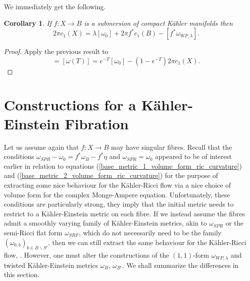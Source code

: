 \documentclass[12pt]{article}
\newtheorem{corollary}[theorem]{Corollary}
\numberwithin{equation}{section}
\begin{document}
\noindent We immediately get the following.

\begin{corollary}
If $f:X \to B$ is a submersion of compact K\"ahler manifolds then
\begin{equation*}
    2\pi c_1(X) = \lambda [\omega_0] + 2\pi f^* c_1(B) - [f^*\omega_{WP,\lambda}].
\end{equation*}
\end{corollary}

\begin{proof}
Apply the previous result to
\begin{equation*}
    [f^*\eta] = [\omega(T)] = e^{-T} [\omega_0] - (1-e^{-T}) 2\pi c_1(X).
\end{equation*}
\end{proof}

\section{Constructions for a K\"ahler-Einstein Fibration}

\noindent Let us assume again that $f: X \to B$ may have singular fibres. Recall that the conditions $\omega_{SPR} - \omega_0 = f^*\omega_B - f^*\eta$ and $\omega_{SPR} = \omega_0$ appeared to be of interest earlier in relation to equations (\ref{base_metric_1_volume_form_ric_curvature}) and (\ref{base_metric_2_volume_form_ric_curvature}) for the purpose of extracting some nice behaviour for the K\"ahler-Ricci flow via a nice choice of volume form for the complex Monge-Ampere equation. Unfortunately, these conditions are particularly strong, they imply that the initial metric needs to restrict to a K\"ahler-Einstein metric on each fibre. If we instead assume the fibres admit a smoothly varying family of K\"ahler-Einstein metrics, akin to $\omega_{SPR}$ or the semi-Ricci flat form $\omega_{SRF}$, which do not necessarily need to be the family $(\omega_{0,b})_{b \in B \backslash S'}$, then we can still extract the same behaviour for the K\"ahler-Ricci flow, \cite[Thm. 1.2]{B25}. However, one must alter the constructions of the $(1,1)$-form $\omega_{WP,\lambda}$ and twisted K\"ahler-Einstein metrics $\omega_{B}$, $\omega_{B'}$. We shall summarize the differences in this section.\\
\end{document}
